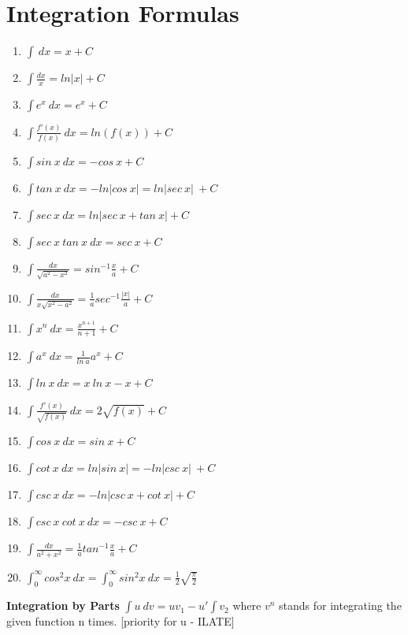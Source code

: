 \section{Integration Formulas}
\begin{multicols}{2}
\begin{enumerate}
    \item \(\int \ dx=x+C\) %
    \item \(\int \frac{dx}{x}=ln|x|+C\) %
    \item \(\int e^x \ dx=e^x+C\) %
    \item \(\int \frac{f'(x)}{f(x)}\ dx=ln(f(x))+C\) %
    \item \(\int sin\ x\ dx=-cos\ x+C\) %
    \item \(\int tan\ x\ dx=-ln|cos\ x|=ln|sec\ x|\ +C\) %
    \item \(\int sec\ x\ dx=ln|sec\ x+tan\ x|+C\) %
    \item \(\int sec\ x\ tan\ x\ dx=sec\ x+C\) %
    \item \(\int \frac{dx}{\sqrt{a^2-x^2}}=sin^{-1}\frac{x}{a}+C\) %
    \item \(\int \frac{dx}{x\sqrt{x^2-a^2}}=\frac{1}{a}sec^{-1}\frac{|x|}{a}+C\) %
    \item \(\int x^n\ dx=\frac{x^{n+1}}{n+1}+C\) %
    \item \(\int a^x\ dx=\frac{1}{ln\ a} a^x+C\) %
    \item \(\int ln\ x\ dx=x\ ln\ x-x+C\) %
    \item \(\int \frac{f'(x)}{\sqrt{f(x)}}\ dx=2\sqrt{f(x)}+C\) %
    \item \(\int cos\ x\ dx=sin\ x+C\) %
    \item \(\int cot\ x\ dx=ln|sin\ x|=-ln|csc\ x|\ +C\) %
    \item \(\int csc\ x\ dx=-ln|csc\ x+cot\ x|+C\) %
    \item \(\int csc\ x\ cot\ x\ dx=-csc\ x+C\) %
    \item \(\int \frac{dx}{a^2+x^2}=\frac{1}{a}tan^{-1}\frac{x}{a}+C\) %
    \item \(\int_0^{\infty}cos^2x\ dx=\int_0^{\infty}sin^2x\ dx=\frac{1}{2}\sqrt{\frac{\pi}{2}}\) %
\end{enumerate}
\end{multicols}

\textbf{Integration by Parts} \(\int u\ dv = uv_1 - u'\int v_2\) where \(v^n\) stands for integrating the given function n times. [priority for u - ILATE]


